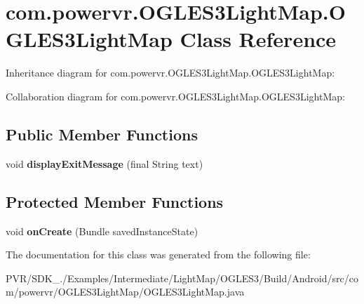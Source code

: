 \hypertarget{classcom_1_1powervr_1_1_o_g_l_e_s3_light_map_1_1_o_g_l_e_s3_light_map}{\section{com.\+powervr.\+O\+G\+L\+E\+S3\+Light\+Map.\+O\+G\+L\+E\+S3\+Light\+Map Class Reference}
\label{classcom_1_1powervr_1_1_o_g_l_e_s3_light_map_1_1_o_g_l_e_s3_light_map}
}


Inheritance diagram for com.\+powervr.\+O\+G\+L\+E\+S3\+Light\+Map.\+O\+G\+L\+E\+S3\+Light\+Map\+:


Collaboration diagram for com.\+powervr.\+O\+G\+L\+E\+S3\+Light\+Map.\+O\+G\+L\+E\+S3\+Light\+Map\+:
\subsection*{Public Member Functions}
\begin{DoxyCompactItemize}
\item 
\hypertarget{classcom_1_1powervr_1_1_o_g_l_e_s3_light_map_1_1_o_g_l_e_s3_light_map_a105ffb53748ba9d5c8a6aa01208a08b1}{void {\bfseries display\+Exit\+Message} (final String text)}\label{classcom_1_1powervr_1_1_o_g_l_e_s3_light_map_1_1_o_g_l_e_s3_light_map_a105ffb53748ba9d5c8a6aa01208a08b1}

\end{DoxyCompactItemize}
\subsection*{Protected Member Functions}
\begin{DoxyCompactItemize}
\item 
\hypertarget{classcom_1_1powervr_1_1_o_g_l_e_s3_light_map_1_1_o_g_l_e_s3_light_map_a163c67a6c7402ffc87cb7fb39806d535}{void {\bfseries on\+Create} (Bundle saved\+Instance\+State)}\label{classcom_1_1powervr_1_1_o_g_l_e_s3_light_map_1_1_o_g_l_e_s3_light_map_a163c67a6c7402ffc87cb7fb39806d535}

\end{DoxyCompactItemize}


The documentation for this class was generated from the following file\+:\begin{DoxyCompactItemize}
\item 
P\+V\+R/\+S\+D\+K\+\_./\+Examples/\+Intermediate/\+Light\+Map/\+O\+G\+L\+E\+S3/\+Build/\+Android/src/com/powervr/\+O\+G\+L\+E\+S3\+Light\+Map/O\+G\+L\+E\+S3\+Light\+Map.\+java\end{DoxyCompactItemize}

